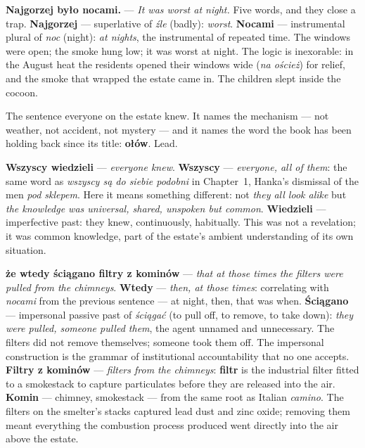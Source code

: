 \medskip

\textbf{Najgorzej było nocami.} --- \textit{It was
worst at night.} Five words, and they close a trap.
\textbf{Najgorzej} --- superlative of \textit{źle}
(badly): \textit{worst}. \textbf{Nocami} ---
instrumental plural of \textit{noc} (night):
\textit{at nights}, the instrumental of repeated
time. The windows were open; the smoke hung low;
it was worst at night. The logic is inexorable:
in the August heat the residents opened their
windows wide (\textit{na oścież}) for relief, and
the smoke that wrapped the estate came in. The
children slept inside the cocoon.



The sentence everyone on the estate knew. It names
the mechanism — not weather, not accident, not
mystery — and it names the word the book has been
holding back since its title: \textbf{ołów}. Lead.

\textbf{Wszyscy wiedzieli} --- \textit{everyone
knew}. \textbf{Wszyscy} --- \textit{everyone, all
of them}: the same word as \textit{wszyscy są do
siebie podobni} in Chapter~1, Hanka's dismissal
of the men \textit{pod sklepem}. Here it means
something different: not \textit{they all look
alike} but \textit{the knowledge was universal,
shared, unspoken but common}. \textbf{Wiedzieli}
--- imperfective past: they knew, continuously,
habitually. This was not a revelation; it was
common knowledge, part of the estate's ambient
understanding of its own situation.

\textbf{że wtedy ściągano filtry z kominów} ---
\textit{that at those times the filters were pulled
from the chimneys}. \textbf{Wtedy} ---
\textit{then, at those times}: correlating with
\textit{nocami} from the previous sentence ---
at night, then, that was when. \textbf{Ściągano}
--- impersonal passive past of \textit{ściągać}
(to pull off, to remove, to take down): \textit{they
were pulled, someone pulled them}, the agent
unnamed and unnecessary. The filters did not
remove themselves; someone took them off. The
impersonal construction is the grammar of
institutional accountability that no one accepts.
\textbf{Filtry z kominów} --- \textit{filters from
the chimneys}: \textbf{filtr} is the industrial
filter fitted to a smokestack to capture
particulates before they are released into the
air. \textbf{Komin} --- chimney, smokestack ---
from the same root as Italian \textit{camino}.
The filters on the smelter's stacks captured lead
dust and zinc oxide; removing them meant
everything the combustion process produced went
directly into the air above the estate.

